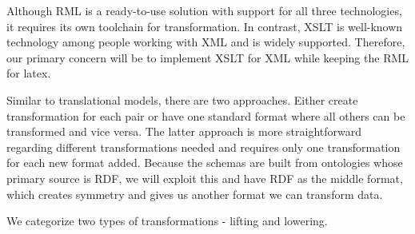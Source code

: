 Although RML is a ready-to-use solution with support for all three technologies, it requires its own toolchain for transformation. In contrast, XSLT is well-known technology among people working with XML and is widely supported. Therefore, our primary concern will be to implement XSLT for XML while keeping the RML for latex.

Similar to translational models, there are two approaches. Either create transformation for each pair or have one standard format where all others can be transformed and vice versa. The latter approach is more straightforward regarding different transformations needed and requires only one transformation for each new format added. Because the schemas are built from ontologies whose primary source is RDF, we will exploit this and have RDF as the middle format, which creates symmetry and gives us another format we can transform data.

We categorize two types of transformations - lifting and lowering.

